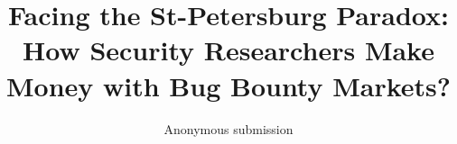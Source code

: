 \documentclass[runningheads]{llncs}
\begin{document}
\title{{\Large Facing the St-Petersburg Paradox:} \\{\large How Security Researchers Make Money with Bug Bounty Markets?}}%

\author{Anonymous submission}
\date{}

\maketitle

\begin{abstract}

\end{abstract}




%







\clearpage

\end{document}
